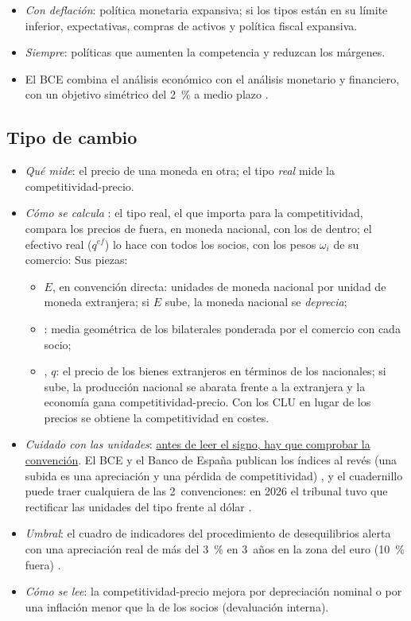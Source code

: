 \documentclass[11pt]{article}
\begin{document}
\begin{itemize}
\item \emph{Con deflación}: política monetaria expansiva; si los tipos están en su límite inferior, expectativas, compras de activos y política fiscal expansiva.
\item \emph{Siempre}: políticas que aumenten la competencia y reduzcan los márgenes.
\item El BCE combina el análisis económico con el análisis monetario y financiero, con un objetivo simétrico del 2~\% a medio plazo \parencite{BCE2025Estrategia} .
\end{itemize}

\subsection{Tipo de cambio}\label{sec:tipo-cambio}

\begin{itemize}
\item \emph{Qué mide}: el precio de una moneda en otra; el tipo \emph{real} mide la competitividad-precio.
\item \emph{Cómo se calcula} : el tipo real, el que importa para la competitividad, compara los precios de fuera, en moneda nacional, con los de dentro; el efectivo real ($q^{ef}$) lo hace con todos los socios, con los pesos $\omega_i$ de su comercio:
  Sus piezas:
  \begin{itemize}
  \item {} $E$, en convención directa: unidades de moneda nacional por unidad de moneda extranjera; si $E$ sube, la moneda nacional se \emph{deprecia};
  \item {}: media geométrica de los bilaterales ponderada por el comercio con cada socio;
  \item {}, $q$: el precio de los bienes extranjeros en términos de los nacionales; si sube, la producción nacional se abarata frente a la extranjera y la economía gana competitividad-precio. Con los CLU en lugar de los precios se obtiene la competitividad en costes.
  \end{itemize}
\item \emph{Cuidado con las unidades}: \uline{antes de leer el signo, hay que comprobar la convención}. El BCE y el Banco de España publican los índices al revés (una subida es una apreciación y una pérdida de competitividad) , y el cuadernillo puede traer cualquiera de las 2~convenciones: en 2026 el tribunal tuvo que rectificar las unidades del tipo frente al dólar \parencite{ATCEE2026Examenes}.
\item \emph{Umbral}: el cuadro de indicadores del procedimiento de desequilibrios alerta con una apreciación real de más del 3~\% en 3~años en la zona del euro (10~\% fuera) \parencite{CE2025AMR2026}.
\item \emph{Cómo se lee}: la competitividad-precio mejora por depreciación nominal o por una inflación menor que la de los socios (devaluación interna).
\end{itemize}
\end{document}
